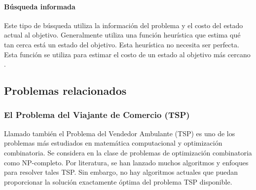 \paragraph{Búsqueda informada}
Este tipo de búsqueda utiliza la información del problema y el costo del estado actual al objetivo. Generalmente utiliza una función heurística que estima qué tan cerca está un estado del objetivo. Esta heurística no necesita ser perfecta. Esta función se utiliza para estimar el costo de un estado al objetivo más cercano \cite{SearchIntelligence}.

\subsection{Problemas relacionados}
\subsubsection{El Problema del Viajante de Comercio (TSP)}
Llamado también el Problema del Vendedor Ambulante (TSP) es uno de los problemas más estudiados en matemática computacional y optimización combinatoria. Se considera en la clase de problemas de optimización combinatoria como NP-completo. Por literatura, se han lanzado muchos algoritmos y enfoques para resolver tales TSP. Sin embargo, no hay algoritmos actuales que puedan proporcionar la solución exactamente óptima del problema TSP disponible. \cite{SuwannarongsriSolvingTechniques} 





